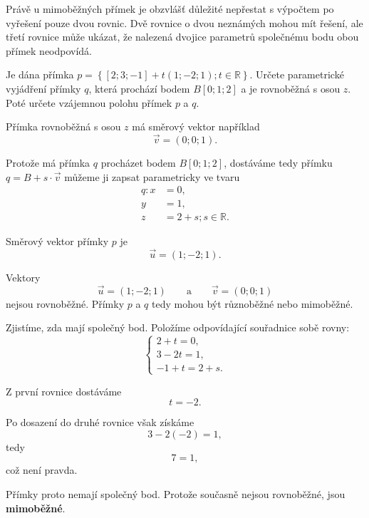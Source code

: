 \begin{remark}
    Právě u mimoběžných přímek je obzvlášť důležité nepřestat
    s výpočtem po vyřešení pouze dvou rovnic. Dvě rovnice o dvou
    neznámých mohou mít řešení, ale třetí rovnice může ukázat,
    že nalezená dvojice parametrů společnému bodu obou přímek
    neodpovídá.
\end{remark}

\begin{example}
    \label{exa:Construct_skew_line_space}

    Je dána přímka $p=\left\{\left[2;3;-1\right] + t\left(1;-2;1\right); t\in\mathbb{R}\right\}$.
    Určete parametrické vyjádření přímky $q$, která prochází bodem $B[0;1;2]$ a je rovnoběžná s osou $z$. 
    Poté určete vzájemnou polohu přímek $p$ a $q$.

    Přímka rovnoběžná s osou $z$ má směrový vektor například
    \[
        \vec{v}=(0;0;1).
    \]

    Protože má přímka $q$ procházet bodem $B[0;1;2]$, dostáváme tedy přímku $q=B+s\cdot \vec{v}$ můžeme ji
    zapsat parametricky ve tvaru
    \[
        \begin{aligned}
            q: x&=0,\\
            y&=1,\\
            z&=2+s; s\in\mathbb{R}.
        \end{aligned}
    \]

    Směrový vektor přímky $p$ je
    \[
        \vec{u}=(1;-2;1).
    \]

    Vektory
    \[
        \vec{u}=(1;-2;1)
        \qquad\text{a}\qquad
        \vec{v}=(0;0;1)
    \]
    nejsou rovnoběžné. Přímky $p$ a $q$ tedy mohou být různoběžné
    nebo mimoběžné.

    Zjistíme, zda mají společný bod. Položíme odpovídající souřadnice
    sobě rovny:
    \[
        \begin{cases}
            2+t=0,\\
            3-2t=1,\\
            -1+t=2+s.
        \end{cases}
    \]

    Z první rovnice dostáváme
    \[
        t=-2.
    \]

    Po dosazení do druhé rovnice však získáme
    \[
        3-2(-2)=1,
    \]
    tedy
    \[
        7=1,
    \]
    což není pravda.

    Přímky proto nemají společný bod. Protože současně nejsou
    rovnoběžné, jsou \textbf{mimoběžné}.
\end{example}

